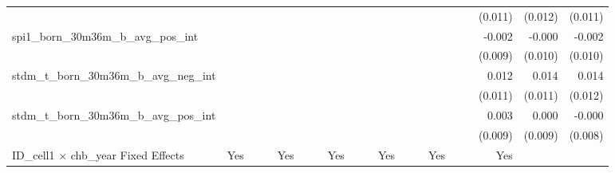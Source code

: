 \begin{tabular}{lrrrrrrrrrrrrrrrrrr}
                                            &              &              &              &              &              &              &              &              &               &              &              &               &              &              &               &      (0.011) &      (0.012) &       (0.011) \\ 
spi1\_born\_30m36m\_b\_avg\_pos\_int        &              &              &              &              &              &              &              &              &               &              &              &               &              &              &               &       -0.002 &       -0.000 &        -0.002 \\ 
                                            &              &              &              &              &              &              &              &              &               &              &              &               &              &              &               &      (0.009) &      (0.010) &       (0.010) \\ 
stdm\_t\_born\_30m36m\_b\_avg\_neg\_int     &              &              &              &              &              &              &              &              &               &              &              &               &              &              &               &        0.012 &        0.014 &         0.014 \\ 
                                            &              &              &              &              &              &              &              &              &               &              &              &               &              &              &               &      (0.011) &      (0.011) &       (0.012) \\ 
stdm\_t\_born\_30m36m\_b\_avg\_pos\_int     &              &              &              &              &              &              &              &              &               &              &              &               &              &              &               &        0.003 &        0.000 &        -0.000 \\ 
                                            &              &              &              &              &              &              &              &              &               &              &              &               &              &              &               &      (0.009) &      (0.009) &       (0.008) \\ 
\midrule
ID\_cell1 $\times$ chb\_year Fixed Effects  &          Yes &              &              &          Yes &              &              &          Yes &              &               &          Yes &              &               &          Yes &              &               &          Yes &              &               \\ 

\end{tabular}
